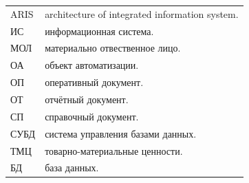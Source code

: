 \documentclass[12pt, a4paper, simple]{eskdtext}
\begin{document}
    \begin{tabular}{ll} 
        ARIS    & architecture of integrated information system.\\
        ИС      & информационная система.\\
        МОЛ     & материально отвественное лицо.\\
        ОА      & объект автоматизации.\\
        ОП      & оперативный документ.\\
        ОТ      & отчётный документ.\\
        СП      & справочный документ.\\
        СУБД    & система управления базами данных.\\
        ТМЦ     & товарно-материальные ценности.\\
        БД      & база данных.\\
    \end{tabular}
    
    \newpage
\end{document}
